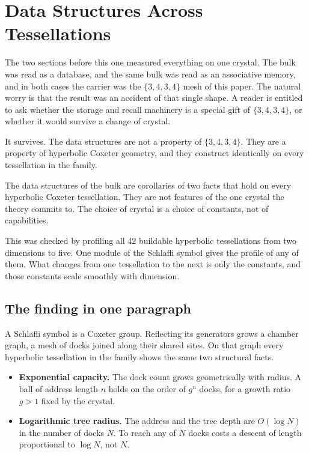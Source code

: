 \section{Data Structures Across Tessellations}

The two sections before this one measured everything on one crystal. The bulk was read as a database, and the same bulk was read as an associative memory, and in both cases the carrier was the $\{3,4,3,4\}$ mesh of this paper. The natural worry is that the result was an accident of that single shape. A reader is entitled to ask whether the storage and recall machinery is a special gift of $\{3,4,3,4\}$, or whether it would survive a change of crystal.

It survives. The data structures are not a property of $\{3,4,3,4\}$. They are a property of hyperbolic Coxeter geometry, and they construct identically on every tessellation in the family.

\begin{result}
The data structures of the bulk are corollaries of two facts that hold on every hyperbolic Coxeter tessellation. They are not features of the one crystal the theory commits to. The choice of crystal is a choice of constants, not of capabilities.
\end{result}

This was checked by profiling all $42$ buildable hyperbolic tessellations from two dimensions to five. One module of the Schlafli symbol gives the profile of any of them. What changes from one tessellation to the next is only the constants, and those constants scale smoothly with dimension.

\subsection{The finding in one paragraph}

A Schlafli symbol is a Coxeter group. Reflecting its generators grows a chamber graph, a mesh of docks joined along their shared sites. On that graph every hyperbolic tessellation in the family shows the same two structural facts.

\begin{itemize}
\item \textbf{Exponential capacity.} The dock count grows geometrically with radius. A ball of address length $n$ holds on the order of $g^{n}$ docks, for a growth ratio $g > 1$ fixed by the crystal.
\item \textbf{Logarithmic tree radius.} The address and the tree depth are $O(\log N)$ in the number of docks $N$. To reach any of $N$ docks costs a descent of length proportional to $\log N$, not $N$.
\end{itemize}

